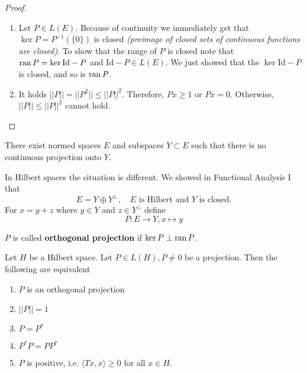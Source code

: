 \documentclass[9pt]{extarticle}
\begin{document}
\begin{proof}
\begin{enumerate}
\item Let $P \in L(E)$. Because of continuity we immediately get that $\ker P = P^{-1}(\{0 \})$ is closed \textit{(preimage of closed sets of continuous functions are closed)}. To show that the range of $P$ is closed note that $\operatorname{ran} P = \ker \mathrm{Id} - P$ and $\mathrm{Id} - P \in L(E)$. We just showed that the $\ker \mathrm{Id} - P$ is closed, and so is $\operatorname{ran} P$.

\item It holds $||P|| = ||P^2|| \leq ||P||^2$. Therefore, $Px \geq 1$ or $Px = 0$. Otherwise, $||P|| \leq ||P||^2$ cannot hold.
\end{enumerate}
\end{proof}

There exist normed spaces $E$ and  subspaces $Y \subset E$ such that there is no continuous projection onto $Y$.

In Hilbert spaces the situation is different. We showed in Functional Analysis I that 
\[
    E = Y \oplus Y^\perp, \quad \text{$E$ is Hilbert and $Y$ is closed.}
\]
For $x = y + z$ where $y \in Y$ and $z \in Y^\perp$ define 
\[
    P: E \to Y, x \mapsto y
\]

\begin{definition}{}{}
    $P$ is called \textbf{orthogonal projection} if $\ker P \perp \operatorname{ran} P$.
\end{definition}

\begin{proposition}{}{}
Let $H$ be a Hilbert space. Let $P \in L(H), P \neq 0$ be a projection. Then the following are equivalent
\begin{enumerate}
\item $P$ is an orthogonal projection
\item $||P|| = 1$
\item $P = P^*$
\item $P^*P = PP^*$
\item $P$ is positive, i.e. $\langle Tx,x \rangle \geq 0$ for all $x \in H$.
\end{enumerate}
\end{proposition}
\end{document}
